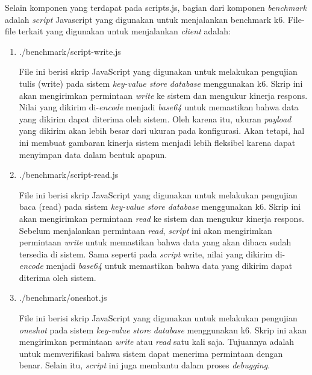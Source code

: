 Selain komponen yang terdapat pada scripts.js, bagian dari komponen \textit{benchmark} adalah \textit{script} Javascript yang digunakan untuk menjalankan benchmark k6. File-file terkait yang digunakan untuk menjalankan \textit{client} adalah:

\begin{enumerate}
	\item ./benchmark/script-write.js

	      File ini berisi skrip JavaScript yang digunakan untuk melakukan pengujian tulis (write) pada sistem \textit{key-value store database} menggunakan k6. Skrip ini akan mengirimkan permintaan \textit{write} ke sistem dan mengukur kinerja respons. Nilai yang dikirim di-\textit{encode} menjadi \textit{base64} untuk memastikan bahwa data yang dikirim dapat diterima oleh sistem. Oleh karena itu, ukuran \textit{payload} yang dikirim akan lebih besar dari ukuran pada konfigurasi. Akan tetapi, hal ini membuat gambaran kinerja sistem menjadi lebih fleksibel karena dapat menyimpan data dalam bentuk apapun.

	\item ./benchmark/script-read.js

	      File ini berisi skrip JavaScript yang digunakan untuk melakukan pengujian baca (read) pada sistem \textit{key-value store database} menggunakan k6. Skrip ini akan mengirimkan permintaan \textit{read} ke sistem dan mengukur kinerja respons. Sebelum menjalankan permintaan \textit{read}, \textit{script} ini akan mengirimkan permintaan \textit{write} untuk memastikan bahwa data yang akan dibaca sudah tersedia di sistem. Sama seperti pada \textit{script} write, nilai yang dikirim di-\textit{encode} menjadi \textit{base64} untuk memastikan bahwa data yang dikirim dapat diterima oleh sistem.

	\item ./benchmark/oneshot.js

	      File ini berisi skrip JavaScript yang digunakan untuk melakukan pengujian \textit{oneshot} pada sistem \textit{key-value store database} menggunakan k6. Skrip ini akan mengirimkan permintaan \textit{write} atau \textit{read} satu kali saja. Tujuannya adalah untuk memverifikasi bahwa sistem dapat menerima permintaan dengan benar. Selain itu, \textit{script} ini juga membantu dalam proses \textit{debugging}.
\end{enumerate}